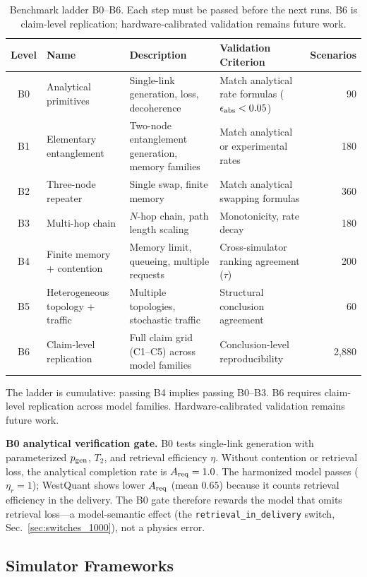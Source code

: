 \documentclass{ams-journal}
\newcommand{\Areq}{A_{\rm req}}
\begin{document}
\begin{table}[t]
\centering
\caption{Benchmark ladder B0--B6. Each step must be passed before the next runs. B6 is claim-level replication; hardware-calibrated validation remains future work.}
\label{tab:benchmarks}
\footnotesize
\begin{tabular}{clp{4cm}p{4cm}r}
\toprule
Level & Name & Description & Validation Criterion & Scenarios \\
\midrule
B0 & Analytical primitives & Single-link generation, loss, decoherence & Match analytical rate formulas ($\epsilon_{\rm abs} < 0.05$) & 90 \\
B1 & Elementary entanglement & Two-node entanglement generation, memory families & Match analytical or experimental rates & 180 \\
B2 & Three-node repeater & Single swap, finite memory & Match analytical swapping formulas & 360 \\
B3 & Multi-hop chain & $N$-hop chain, path length scaling & Monotonicity, rate decay & 180 \\
B4 & Finite memory + contention & Memory limit, queueing, multiple requests & Cross-simulator ranking agreement ($\tau$) & 200 \\
B5 & Heterogeneous topology + traffic & Multiple topologies, stochastic traffic & Structural conclusion agreement & 60 \\
B6 & Claim-level replication & Full claim grid (C1--C5) across model families & Conclusion-level reproducibility & 2{,}880 \\
\bottomrule
\end{tabular}
\end{table}

The ladder is cumulative: passing B4 implies passing B0--B3. B6 requires claim-level replication across model families. Hardware-calibrated validation remains future work.

\textbf{B0 analytical verification gate.} B0 tests single-link generation with parameterized $p_{\rm gen}$, $T_2$, and retrieval efficiency $\eta$. Without contention or retrieval loss, the analytical completion rate is $\Areq = 1.0$. The harmonized model passes ($\eta_r = 1$); WestQuant shows lower $\Areq$ (mean $0.65$) because it counts retrieval efficiency in the delivery. The B0 gate therefore rewards the model that omits retrieval loss---a model-semantic effect (the \texttt{retrieval\_in\_delivery} switch, Sec.~\ref{sec:switches_1000}), not a physics error.

\subsection{Simulator Frameworks}
\end{document}
